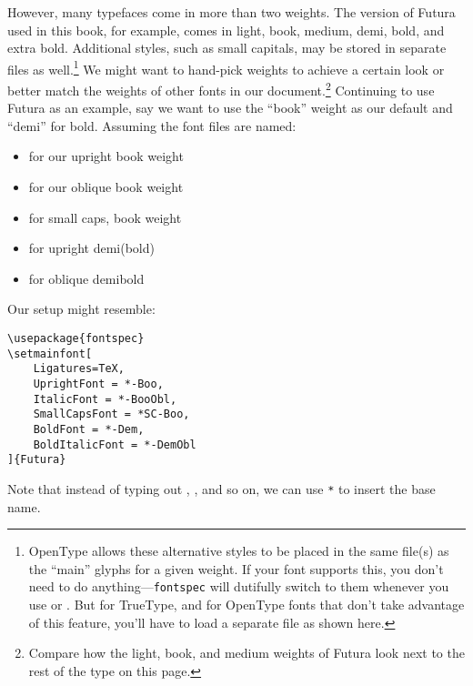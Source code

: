 However, many typefaces come in more than two weights.
The version of Futura used in this book, for example, comes in
{light},
{book},
{medium},
{demi},
{bold}, and
{extra bold}.
Additional styles, such as
{small capitals},
may be stored in separate files as well.\punckern\footnote{%
OpenType allows these alternative styles to be placed in the same file(s) as the
``main'' glyphs for a given weight.
If your font supports this, you don't need to do anything---\texttt{fontspec}
will dutifully switch to them whenever you use
 or .
But for TrueType, and for OpenType fonts that don't take advantage of this
feature, you'll have to load a separate file as shown here.}
We might want to hand-pick weights to achieve a certain look or better match the
weights of other fonts in our document.\punckern\footnote{Compare how
{the light,}
{book,}
{and medium weights}
of Futura look next to the rest of the type on this page.}
Continuing to use Futura as an example,
say we want to use the ``book'' weight as our default
and ``demi'' for bold.
Assuming the font files are named:
\begin{itemize}
\item {} for our
    {upright book weight}
\item {} for our
    {oblique book weight}
\item {} for
    {small caps, book weight}
\item {} for
    {upright demi(bold)}
\item {} for
    {oblique demibold}
\end{itemize}

\noindent Our setup might resemble:
\begin{leftfigure}
\begin{lstlisting}
\usepackage{fontspec}
\setmainfont[
    Ligatures=TeX,
    UprightFont = *-Boo,
    ItalicFont = *-BooObl,
    SmallCapsFont = *SC-Boo,
    BoldFont = *-Dem,
    BoldItalicFont = *-DemObl
]{Futura}
\end{lstlisting}
\end{leftfigure}
Note that instead of typing out ,
, and so on, we can use \texttt{*} to insert the base name.


